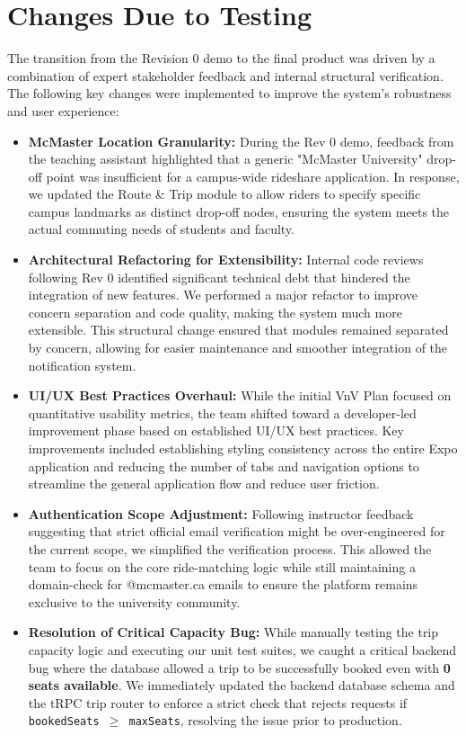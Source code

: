 \section{Changes Due to Testing}

The transition from the Revision 0 demo to the final product was driven by a combination of expert stakeholder feedback and internal structural verification. The following key changes were implemented to improve the system's robustness and user experience:

\begin{itemize}
    \item \textbf{McMaster Location Granularity:} During the Rev 0 demo, feedback from the teaching assistant highlighted that a generic "McMaster University" drop-off point was insufficient for a campus-wide rideshare application. In response, we updated the Route \& Trip module to allow riders to specify specific campus landmarks as distinct drop-off nodes, ensuring the system meets the actual commuting needs of students and faculty.
    
    \item \textbf{Architectural Refactoring for Extensibility:} Internal code reviews following Rev 0 identified significant technical debt that hindered the integration of new features. We performed a major refactor to improve concern separation and code quality, making the system much more extensible. This structural change ensured that modules remained separated by concern, allowing for easier maintenance and smoother integration of the notification system.

    \item \textbf{UI/UX Best Practices Overhaul:} While the initial VnV Plan focused on quantitative usability metrics, the team shifted toward a developer-led improvement phase based on established UI/UX best practices. Key improvements included establishing styling consistency across the entire Expo application and reducing the number of tabs and navigation options to streamline the general application flow and reduce user friction.

    \item \textbf{Authentication Scope Adjustment:} Following instructor feedback suggesting that strict official email verification might be over-engineered for the current scope, we simplified the verification process. This allowed the team to focus on the core ride-matching logic while still maintaining a domain-check for @mcmaster.ca emails to ensure the platform remains exclusive to the university community.
    \item \textbf{Resolution of Critical Capacity Bug:} While manually testing the trip capacity logic and executing our unit test suites, we caught a critical backend bug where the database allowed a trip to be successfully booked even with \textbf{0 seats available}. We immediately updated the backend database schema and the tRPC trip router to enforce a strict check that rejects requests if \texttt{bookedSeats $\ge$ maxSeats}, resolving the issue prior to production.


\end{itemize}

